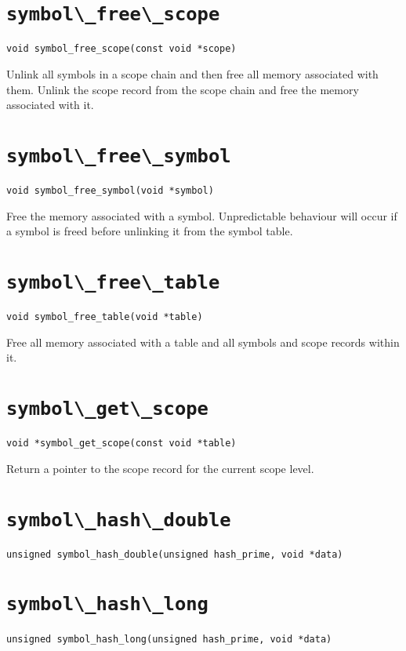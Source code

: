\section{\protect\verb+symbol\_free\_scope+}
\begin{verbatim}
void symbol_free_scope(const void *scope)
\end{verbatim}
Unlink all symbols in a scope chain and then free all memory associated
with them. Unlink the scope record from the scope chain and free the
memory associated with it.

\section{\protect\verb+symbol\_free\_symbol+}
\begin{verbatim}
void symbol_free_symbol(void *symbol)
\end{verbatim}
Free the memory associated with a symbol. Unpredictable behaviour will
occur if a symbol is freed before unlinking it from the symbol table.

\section{\protect\verb+symbol\_free\_table+}
\begin{verbatim}
void symbol_free_table(void *table)
\end{verbatim}
Free all memory associated with a table and all symbols and scope
records within it.

\section{\protect\verb+symbol\_get\_scope+}
\begin{verbatim}
void *symbol_get_scope(const void *table)
\end{verbatim}
Return a pointer to the scope record for the current scope level.

\section{\protect\verb+symbol\_hash\_double+}
\begin{verbatim}
unsigned symbol_hash_double(unsigned hash_prime, void *data)
\end{verbatim}
\section{\protect\verb+symbol\_hash\_long+}
\begin{verbatim}
unsigned symbol_hash_long(unsigned hash_prime, void *data)
\end{verbatim}

